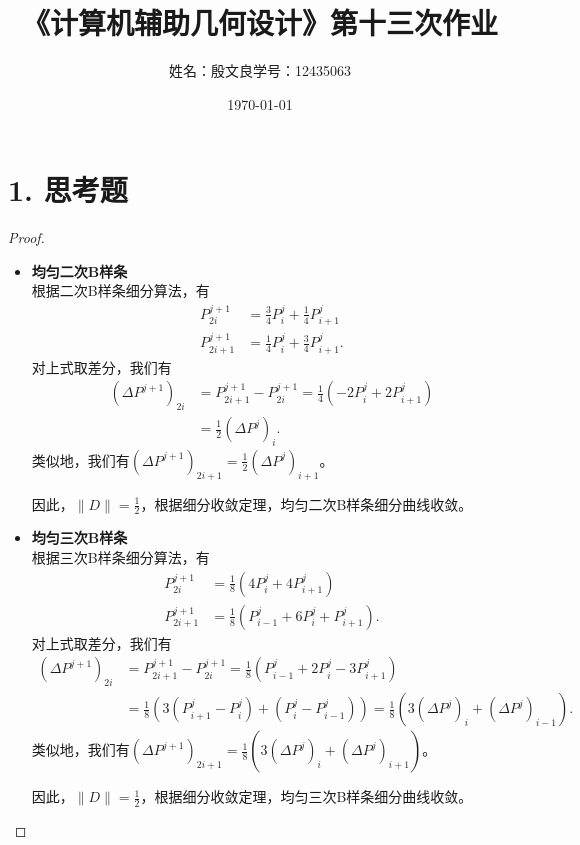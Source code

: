 \documentclass[utf8]{ctexart}
\title{《计算机辅助几何设计》第十三次作业}
\author{姓名：殷文良\qquad 学号：12435063}
\date{\today}
\begin{document}
\maketitle
{}

\section*{1. 思考题}
\begin{proof}
    \begin{itemize}
        \item \textbf{均匀二次B样条}\\
        根据二次B样条细分算法，有
        $$
        \begin{aligned}
            P_{2i}^{j+1} &= \frac{3}{4}P_i^j+\frac{1}{4}P_{i+1}^j\\
            P_{2i+1}^{j+1} &= \frac{1}{4}P_{i}^j + \frac{3}{4}P_{i+1}^j.
        \end{aligned}
        $$
        对上式取差分，我们有
        $$
        \begin{aligned}
            (\Delta P^{j+1})_{2i} &= P_{2i+1}^{j+1} - P_{2i}^{j+1} = \frac{1}{4}(-2P_{i}^j+2P_{i+1}^{j})\\
            &= \frac{1}{2}(\Delta P^j)_i.
        \end{aligned}
        $$
        类似地，我们有$(\Delta P^{j+1})_{2i+1} = \frac{1}{2}(\Delta P^j)_{i+1}$。\par
        因此，$\|D\| = \frac{1}{2}$，根据细分收敛定理，均匀二次B样条细分曲线收敛。
        \item \textbf{均匀三次B样条}\\
        根据三次B样条细分算法，有
        $$
        \begin{aligned}
            P_{2i}^{j+1} &= \frac{1}{8}(4P_i^j+4P_{i+1}^j)\\
            P_{2i+1}^{j+1} &= \frac{1}{8}(P_{i-1}^j + 6P_i^j + P_{i+1}^j).
        \end{aligned}
        $$
        对上式取差分，我们有
        $$
        \begin{aligned}
            (\Delta P^{j+1})_{2i} &= P_{2i+1}^{j+1} - P_{2i}^{j+1} = \frac{1}{8}(P_{i-1}^j+2P_{i}^{j}-3P_{i+1}^{j})\\
            &= \frac{1}{8}(3(P_{i+1}^j-P_i^j) + (P_{i}^j-P_{i-1}^j)) = \frac{1}{8}(3(\Delta P^j)_{i} + (\Delta P^j)_{i-1}).
        \end{aligned}
        $$
        类似地，我们有$(\Delta P^{j+1})_{2i+1} = \frac{1}{8}(3(\Delta P^j)_{i} + (\Delta P^j)_{i+1})$。\par
        因此，$\|D\| = \frac{1}{2}$，根据细分收敛定理，均匀三次B样条细分曲线收敛。
    \end{itemize}
\end{proof}
\end{document}
